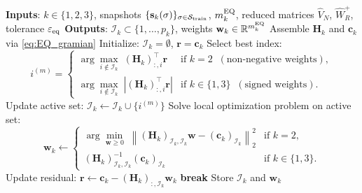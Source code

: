 \begin{algorithm}[h!]
\caption{Empirical Quadrature for the DCP --- offline phase}
\label{alg:EQ_offline}
\begin{algorithmic}[1]
    \STATE \textbf{Inputs}: $k\in\{1,2,3\}$, snapshots $\{\mathbf{s}_k(\sigma)\}_{\sigma \in \mathcal{S}_{\rm train}}$, $m_k^{\rm EQ}$, reduced matrices $\hat{V}_N$, $\hat{W}^+_R$, tolerance $\varepsilon_{\rm eq}$
    \STATE \textbf{Outputs}: $\mathcal{I}_k \subset \{1,\ldots,p_k\}$, weights $\mathbf{w}_k \in \mathbb{R}^{m_k^{\rm EQ}}$
    \STATE Assemble $\mathbf{H}_k$ and $\mathbf{c}_k$ via \eqref{eq:EQ_gramian}
    \STATE Initialize: $\mathcal{I}_k = \emptyset$, $\mathbf{r} = \mathbf{c}_k$
        \STATE Select best index:
        \begin{equation*}
            i^{(m)} = \begin{cases}
                \displaystyle\arg\max_{i \notin \mathcal{I}_k} \; \left(\mathbf{H}_k\right)_{:,i}^\top \mathbf{r} & \text{if } k = 2 \;\; (\text{non-negative weights}), \\[6pt]
                \displaystyle\arg\max_{i \notin \mathcal{I}_k} \; \left|\left(\mathbf{H}_k\right)_{:,i}^\top \mathbf{r}\right| & \text{if } k \in \{1,3\} \;\; (\text{signed weights}).
            \end{cases}
        \end{equation*}
        \STATE Update active set: $\mathcal{I}_k \leftarrow \mathcal{I}_k \cup \{i^{(m)}\}$
        \STATE Solve local optimization problem on active set:
        \begin{equation*}
            \mathbf{w}_k \leftarrow \begin{cases}
                \displaystyle\arg\min_{\mathbf{w} \geq 0} \;
                \left\| \left(\mathbf{H}_k\right)_{\mathcal{I}_k,\mathcal{I}_k} \mathbf{w} - \left(\mathbf{c}_k\right)_{\mathcal{I}_k} \right\|_2^2 & \text{if } k=2, \\[6pt]
                \left(\mathbf{H}_k\right)_{\mathcal{I}_k,\mathcal{I}_k}^{-1} \left(\mathbf{c}_k\right)_{\mathcal{I}_k} & \text{if } k \in \{1,3\}.
            \end{cases}
        \end{equation*}
        \STATE Update residual: $\mathbf{r} \leftarrow \mathbf{c}_k - \left(\mathbf{H}_k\right)_{:,\mathcal{I}_k} \mathbf{w}_k$
            \STATE \textbf{break}
        \ENDIF
    \ENDFOR
    \STATE Store $\mathcal{I}_k$ and $\mathbf{w}_k$
\end{algorithmic}
\end{algorithm}

